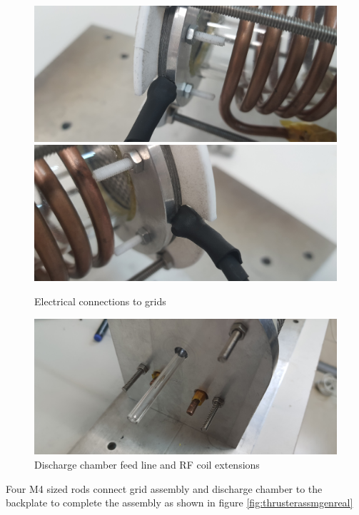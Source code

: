 \begin{figure}[ht]
    \centering
    \includegraphics[width=0.8\linewidth]{fig/assm/real_gridcon.jpg}
    \includegraphics[width=0.8\linewidth]{fig/assm/real_gridcon2.jpg}
    \caption{Electrical connections to grids}
    \label{fig:gridcons}
\end{figure}


\begin{figure}[ht]
    \centering
    \includegraphics[width=0.8\linewidth]{fig/assm/real_backplate.jpg}
    \caption{Discharge chamber feed line and RF coil extensions}
    \label{fig:backplate}
\end{figure}

\newpage
Four M4 sized rods connect grid assembly and discharge chamber to the backplate to complete the assembly as shown in figure \ref{fig:thrusterassmgenreal} 

